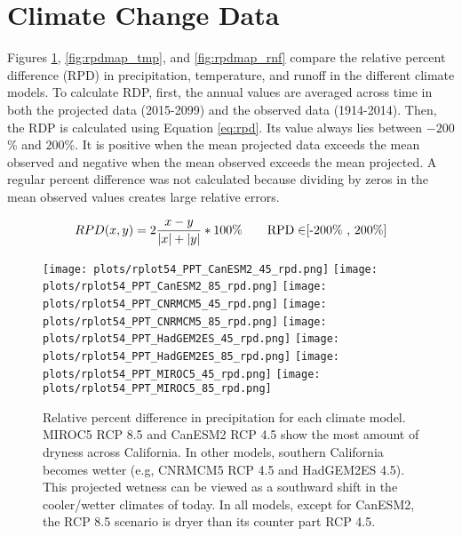 \section{Climate Change Data}
Figures \ref{fig:rpdmap_ppt}, \ref{fig:rpdmap_tmp}, and \ref{fig:rpdmap_rnf} compare the relative percent difference (RPD) in precipitation, temperature, and runoff in the different climate models. To calculate RDP, first, the annual values are averaged across time in both the projected data (2015-2099) and the observed data (1914-2014). Then, the RDP is calculated using Equation \ref{eq:rpd}. Its value always lies between $-200$\% and $200$\%. It is positive when the mean projected data exceeds the mean observed and negative when the mean observed exceeds the mean projected. A regular percent difference was not calculated because dividing by zeros in the mean observed values creates large relative errors. 

\begin{equation}
	\label{eq:rpd}
	RPD(x, y) =2 \frac{x-y}{|x|+|y|} *100\% \quad\quad\text{RPD} \in $[-200\% , 200\%]$\\
\end{equation}



\begin{figure}
    \texttt{[image: plots/rplot54\_PPT\_CanESM2\_45\_rpd.png]}\hfill
    \texttt{[image: plots/rplot54\_PPT\_CanESM2\_85\_rpd.png]}\hfill
    \texttt{[image: plots/rplot54\_PPT\_CNRMCM5\_45\_rpd.png]}\hfill
    \texttt{[image: plots/rplot54\_PPT\_CNRMCM5\_85\_rpd.png]}
    \texttt{[image: plots/rplot54\_PPT\_HadGEM2ES\_45\_rpd.png]}\hfill
    \texttt{[image: plots/rplot54\_PPT\_HadGEM2ES\_85\_rpd.png]}\hfill
    \texttt{[image: plots/rplot54\_PPT\_MIROC5\_45\_rpd.png]}\hfill
    \texttt{[image: plots/rplot54\_PPT\_MIROC5\_85\_rpd.png]}
    \caption[Relative percent difference in precipitation for each climate model.]{Relative percent difference in precipitation for each climate model. MIROC5 RCP 8.5 and CanESM2 RCP 4.5 show the most amount of dryness across California. In other models, southern California becomes wetter (e.g, CNRMCM5 RCP 4.5 and HadGEM2ES 4.5). This projected wetness can be viewed as a southward shift in the cooler/wetter climates of today. In all models, except for CanESM2, the RCP 8.5 scenario is dryer than its counter part RCP 4.5. }
    \label{fig:rpdmap_ppt}
\end{figure}

